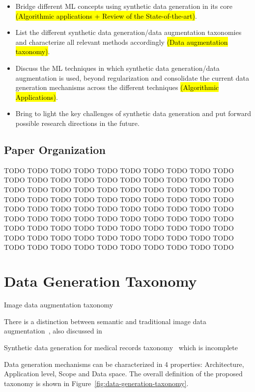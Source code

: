 \documentclass[parskip=full]{scrartcl}
\begin{document}
\begin{itemize}
    \item Bridge different ML concepts using synthetic data generation in its
        core \hl{(Algorithmic applications + Review of the State-of-the-art)}.
    \item List the different synthetic data generation/data augmentation
        taxonomies and characterize all relevant methods accordingly \hl{(Data
        augmentation taxonomy)}.
    \item Discuss the ML techniques in which synthetic data generation/data
        augmentation is used, beyond regularization and consolidate the
        current data generation mechanisms across the different techniques
        \hl{(Algorithmic Applications)}.
    \item Bring to light the key challenges of synthetic data generation and
        put forward possible research directions in the future.
\end{itemize}



\subsection{Paper Organization}

TODO TODO TODO TODO TODO TODO TODO TODO TODO TODO TODO TODO TODO TODO TODO
TODO TODO TODO TODO TODO TODO TODO TODO TODO TODO TODO TODO TODO TODO TODO
TODO TODO TODO TODO TODO TODO TODO TODO TODO TODO TODO TODO TODO TODO TODO
TODO TODO TODO TODO TODO TODO TODO TODO TODO TODO TODO TODO TODO TODO TODO
TODO TODO TODO TODO TODO TODO TODO TODO TODO TODO TODO TODO TODO TODO TODO
TODO TODO TODO TODO TODO TODO TODO TODO TODO TODO TODO TODO TODO TODO TODO

\section{Data Generation Taxonomy}

Image data augmentation taxonomy~\cite{khalifa2021comprehensive}

There is a distinction between semantic and traditional image data
augmentation~\cite{wang2021regularizing}, also discussed
in~\cite{shorten2019survey} 

Synthetic data generation for medical records
taxonomy~\cite{hernandez2022synthetic} which is incomplete



Data generation mechanisms can be characterized in 4 properties: Architecture,
Application level, Scope and Data space. The overall definition of the
proposed taxonomy is shown in Figure~\ref{fig:data-generation-taxonomy}.
\end{document}
